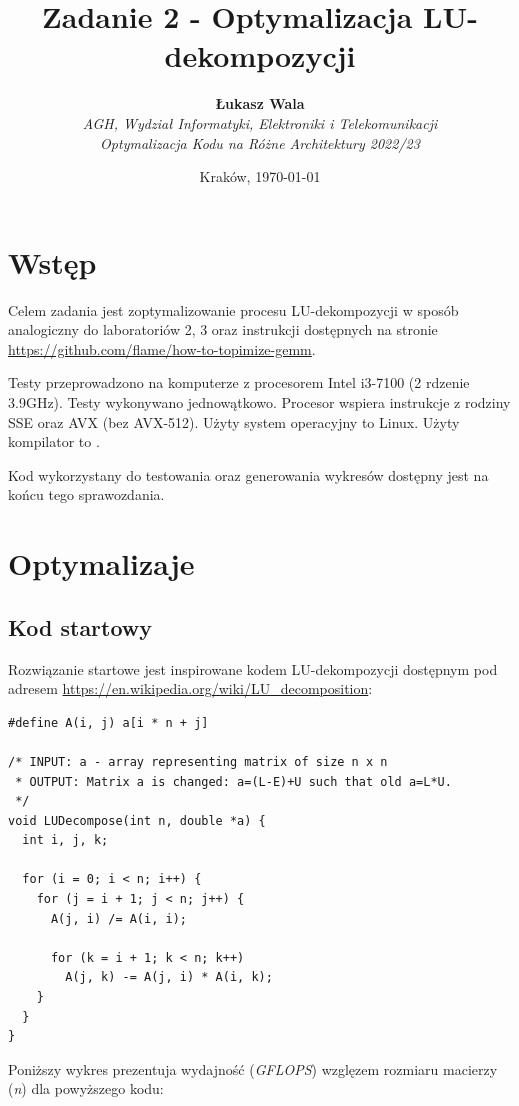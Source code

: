 \documentclass{article}
\title{Zadanie 2 - Optymalizacja LU-dekompozycji}
\author{\textbf{Łukasz Wala}\\
    \textit{AGH, Wydział Informatyki, Elektroniki i Telekomunikacji} \\
    \textit{Optymalizacja Kodu na Różne Architektury 2022/23}}
\date{Kraków, \today}
\begin{document}
\maketitle

\section{Wstęp}

Celem zadania jest zoptymalizowanie procesu LU-dekompozycji w sposób
analogiczny do laboratoriów 2, 3 oraz instrukcji dostępnych na stronie
\url{https://github.com/flame/how-to-topimize-gemm}.

Testy przeprowadzono na komputerze z procesorem Intel i3-7100 (2 rdzenie 3.9GHz).
Testy wykonywano jednowątkowo. Procesor wspiera instrukcje z rodziny SSE oraz AVX (bez AVX-512).
Użyty system operacyjny to Linux. Użyty kompilator to .

Kod wykorzystany do testowania oraz generowania wykresów dostępny jest na końcu tego
sprawozdania.

\section{Optymalizaje}

\subsection{Kod startowy}
Rozwiązanie startowe jest inspirowane kodem LU-dekompozycji dostępnym pod adresem
\url{https://en.wikipedia.org/wiki/LU_decomposition}:

\begin{verbatim}
#define A(i, j) a[i * n + j]

/* INPUT: a - array representing matrix of size n x n
 * OUTPUT: Matrix a is changed: a=(L-E)+U such that old a=L*U.
 */
void LUDecompose(int n, double *a) {
  int i, j, k; 

  for (i = 0; i < n; i++) {
    for (j = i + 1; j < n; j++) {
      A(j, i) /= A(i, i);

      for (k = i + 1; k < n; k++)
        A(j, k) -= A(j, i) * A(i, k);
    }
  }
}
\end{verbatim}

Poniższy wykres prezentuja wydajność (\textit{GFLOPS}) wzglęzem rozmiaru macierzy (\textit{n}) dla powyższego kodu:
\end{document}
